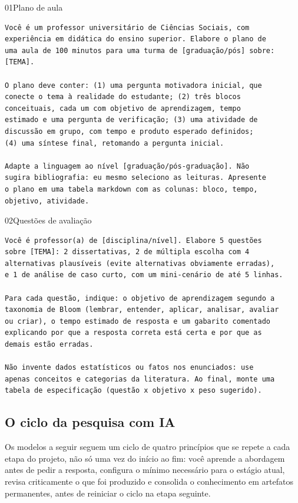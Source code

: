 \documentclass[11pt,a4paper]{article}
\begin{document}
\begin{modelo}{01}{Plano de aula}
\begin{lstlisting}
Você é um professor universitário de Ciências Sociais, com
experiência em didática do ensino superior. Elabore o plano de
uma aula de 100 minutos para uma turma de [graduação/pós] sobre:
[TEMA].

O plano deve conter: (1) uma pergunta motivadora inicial, que
conecte o tema à realidade do estudante; (2) três blocos
conceituais, cada um com objetivo de aprendizagem, tempo
estimado e uma pergunta de verificação; (3) uma atividade de
discussão em grupo, com tempo e produto esperado definidos;
(4) uma síntese final, retomando a pergunta inicial.

Adapte a linguagem ao nível [graduação/pós-graduação]. Não
sugira bibliografia: eu mesmo seleciono as leituras. Apresente
o plano em uma tabela markdown com as colunas: bloco, tempo,
objetivo, atividade.
\end{lstlisting}
\end{modelo}

\begin{modelo}{02}{Questões de avaliação}
\begin{lstlisting}
Você é professor(a) de [disciplina/nível]. Elabore 5 questões
sobre [TEMA]: 2 dissertativas, 2 de múltipla escolha com 4
alternativas plausíveis (evite alternativas obviamente erradas),
e 1 de análise de caso curto, com um mini-cenário de até 5 linhas.

Para cada questão, indique: o objetivo de aprendizagem segundo a
taxonomia de Bloom (lembrar, entender, aplicar, analisar, avaliar
ou criar), o tempo estimado de resposta e um gabarito comentado
explicando por que a resposta correta está certa e por que as
demais estão erradas.

Não invente dados estatísticos ou fatos nos enunciados: use
apenas conceitos e categorias da literatura. Ao final, monte uma
tabela de especificação (questão x objetivo x peso sugerido).
\end{lstlisting}
\end{modelo}

\subsection*{O ciclo da pesquisa com IA}
Os modelos a seguir seguem um ciclo de quatro princípios que se repete a cada etapa do projeto, não só uma vez do início ao fim: você aprende a abordagem antes de pedir a resposta, configura o mínimo necessário para o estágio atual, revisa criticamente o que foi produzido e consolida o conhecimento em artefatos permanentes, antes de reiniciar o ciclo na etapa seguinte.
\end{document}
